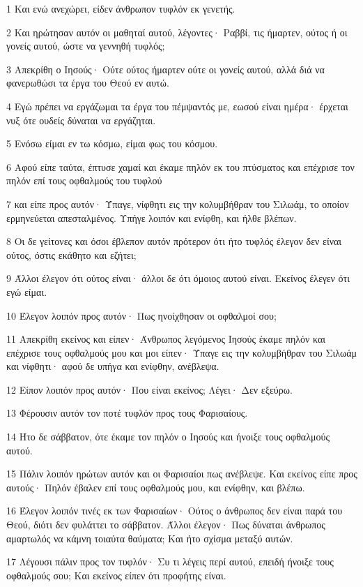 \par 1 Και ενώ ανεχώρει, είδεν άνθρωπον τυφλόν εκ γενετής.
\par 2 Και ηρώτησαν αυτόν οι μαθηταί αυτού, λέγοντες· Ραββί, τις ήμαρτεν, ούτος ή οι γονείς αυτού, ώστε να γεννηθή τυφλός;
\par 3 Απεκρίθη ο Ιησούς· Ούτε ούτος ήμαρτεν ούτε οι γονείς αυτού, αλλά διά να φανερωθώσι τα έργα του Θεού εν αυτώ.
\par 4 Εγώ πρέπει να εργάζωμαι τα έργα του πέμψαντός με, εωσού είναι ημέρα· έρχεται νυξ ότε ουδείς δύναται να εργάζηται.
\par 5 Ενόσω είμαι εν τω κόσμω, είμαι φως του κόσμου.
\par 6 Αφού είπε ταύτα, έπτυσε χαμαί και έκαμε πηλόν εκ του πτύσματος και επέχρισε τον πηλόν επί τους οφθαλμούς του τυφλού
\par 7 και είπε προς αυτόν· Ύπαγε, νίφθητι εις την κολυμβήθραν του Σιλωάμ, το οποίον ερμηνεύεται απεσταλμένος. Υπήγε λοιπόν και ενίφθη, και ήλθε βλέπων.
\par 8 Οι δε γείτονες και όσοι έβλεπον αυτόν πρότερον ότι ήτο τυφλός έλεγον δεν είναι ούτος, όστις εκάθητο και εζήτει;
\par 9 Άλλοι έλεγον ότι ούτος είναι· άλλοι δε ότι όμοιος αυτού είναι. Εκείνος έλεγεν ότι εγώ είμαι.
\par 10 Έλεγον λοιπόν προς αυτόν· Πως ηνοίχθησαν οι οφθαλμοί σου;
\par 11 Απεκρίθη εκείνος και είπεν· Άνθρωπος λεγόμενος Ιησούς έκαμε πηλόν και επέχρισε τους οφθαλμούς μου και μοι είπεν· Ύπαγε εις την κολυμβήθραν του Σιλωάμ και νίφθητι· αφού δε υπήγα και ενίφθην, ανέβλεψα.
\par 12 Είπον λοιπόν προς αυτόν· Που είναι εκείνος; Λέγει· Δεν εξεύρω.
\par 13 Φέρουσιν αυτόν τον ποτέ τυφλόν προς τους Φαρισαίους.
\par 14 Ήτο δε σάββατον, ότε έκαμε τον πηλόν ο Ιησούς και ήνοιξε τους οφθαλμούς αυτού.
\par 15 Πάλιν λοιπόν ηρώτων αυτόν και οι Φαρισαίοι πως ανέβλεψε. Και εκείνος είπε προς αυτούς· Πηλόν έβαλεν επί τους οφθαλμούς μου, και ενίφθην, και βλέπω.
\par 16 Έλεγον λοιπόν τινές εκ των Φαρισαίων· Ούτος ο άνθρωπος δεν είναι παρά του Θεού, διότι δεν φυλάττει το σάββατον. Άλλοι έλεγον· Πως δύναται άνθρωπος αμαρτωλός να κάμνη τοιαύτα θαύματα; Και ήτο σχίσμα μεταξύ αυτών.
\par 17 Λέγουσι πάλιν προς τον τυφλόν· Συ τι λέγεις περί αυτού, επειδή ήνοιξε τους οφθαλμούς σου; Και εκείνος είπεν ότι προφήτης είναι.
